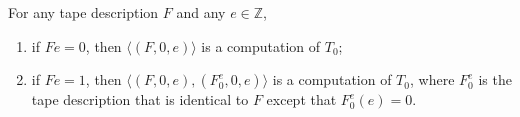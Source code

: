 For any tape description $F$ and any $e \in \mathbb{Z}$,
\begin{enumerate}
\item[(i)] if $Fe = 0$, then $\langle (F, 0, e) \rangle$ is a computation of $T_0$;
\item[(ii)] if $Fe = 1$, then $\langle (F, 0, e), (F_0^e, 0, e) \rangle$ is a computation of $T_0$, where $F_0^e$ is the tape description that is identical to $F$ except that $F_0^e(e) = 0$.
\end{enumerate}
